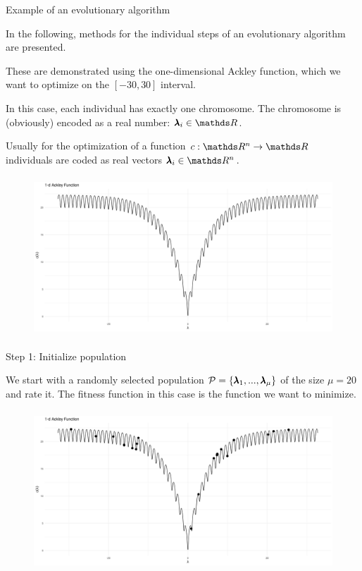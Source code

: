 \begin{frame}[allowframebreaks]{Example of an evolutionary algorithm}

In the following, methods for the individual steps of an evolutionary algorithm are presented.

\vspace{0.5cm}

These are demonstrated using the one-dimensional Ackley function, which we want to optimize on the $[-30, 30]$ interval.

\vspace{0.5cm}

In this case, each individual has exactly one chromosome. The chromosome is (obviously) encoded as a real number: $\xx_i \in \R$.

Usually for the optimization of a function $\f:\R^n \to \R$ individuals are coded as real vectors $\xx_i \in \R^n$.


\framebreak


\begin{center}
\begin{figure}
\includegraphics[width=\textwidth, height=6cm]{images/ea_ex1.png}
\end{figure}
\end{center}

\end{frame}


\begin{frame}{Step 1: Initialize population}

We start with a randomly selected population $\mathcal{P} = \{\pmb{\lambda}_1, ..., \pmb{\lambda}_\mu\}$ of the size $\mu = 20$ and rate it. The fitness function in this case is the function we want to minimize.


\begin{center}
\begin{figure}
\includegraphics[width=\textwidth, height=6cm]{images/ea_ex2.png}
\end{figure}
\end{center}


\end{frame}

